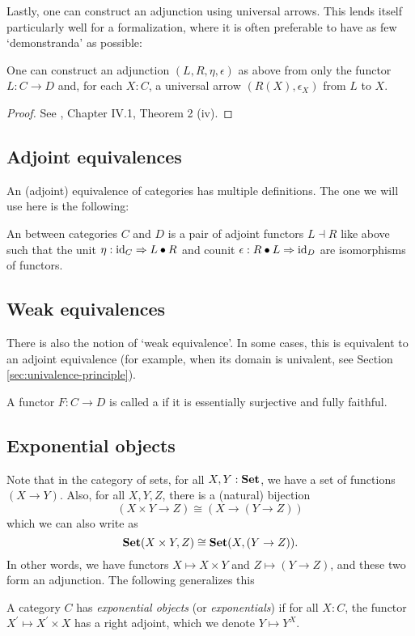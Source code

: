 Lastly, one can construct an adjunction using universal arrows. This lends itself particularly well for a formalization, where it is often preferable to have as few `demonstranda' as possible:
\begin{lemma}
  One can construct an adjunction $ (L, R, \eta, \epsilon) $ as above from only the functor $ L: C \to D $ and, for each $ X: C $, a universal arrow $ (R(X), \epsilon_X) $ from $ L $ to $ X $.
\end{lemma}
\begin{proof}
  See \autocite{MacLane}, Chapter IV.1, Theorem 2 (iv).
\end{proof}

\subsection{Adjoint equivalences}
An (adjoint) equivalence of categories has multiple definitions. The one we will use here is the following:

\begin{definition}\label{def:equivalence-of-categories}
  An  between categories $ C $ and $ D $ is a pair of adjoint functors $ L \dashv R $ like above such that the unit $ \eta: \text{id}_{C} \Rightarrow L \bullet R $ and counit $ \epsilon: R \bullet L \Rightarrow \text{id}_{D} $ are isomorphisms of functors.
\end{definition}

\subsection{Weak equivalences}
There is also the notion of `weak equivalence'. In some cases, this is equivalent to an adjoint equivalence (for example, when its domain is univalent, see Section \ref{sec:univalence-principle}).
\begin{definition}
  A functor $ F: C \to D $ is called a  if it is essentially surjective and fully faithful.
\end{definition}

\subsection{Exponential objects}
Note that in the category of sets, for all $ X, Y: \mathbf{Set} $, we have a set of functions $ (X \to Y) $. Also, for all $ X, Y, Z $, there is a (natural) bijection
\[ (X \times Y \to Z) \cong (X \to (Y \to Z)) \]
which we can also write as
\[ \mathbf{Set}(X \times Y, Z) \cong \mathbf{Set}(X, (Y \to Z)). \]
In other words, we have functors $ X \mapsto X \times Y $ and $ Z \mapsto (Y \to Z) $, and these two form an adjunction. The following generalizes this
\begin{definition}
  A category $ C $ has \textit{exponential objects} (or \textit{exponentials}) if for all $ X: C $, the functor $ X^\prime \mapsto X^\prime \times X $ has a right adjoint, which we denote $ Y \mapsto Y^X $.
\end{definition}

